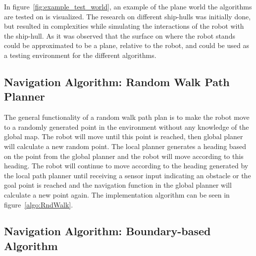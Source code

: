 In figure~\ref{fig:example_test_world}, an example of the plane world the algorithms are tested on is visualized. The research on different ship-hulls was initially done, but resulted in complexities while simulating the interactions of the robot with the ship-hull. As it was observed that the surface on where the robot stands could be approximated to be a plane, relative to the robot, and could be used as a testing environment for the different algorithms.

\subsection{Navigation Algorithm: Random Walk Path Planner}\label{section:rng_walk}

The general functionality of a random walk path plan is to make the robot move to a randomly generated point in the environment without any knowledge of the global map. The robot will move until this point is reached, then global planer will calculate a new random point. The local planner generates a heading based on the point from the global planner and the robot will move according to this heading. The robot will continue to move according to the heading generated by the local path planner until receiving a sensor input indicating an obstacle or the goal point is reached and the navigation function in the global planner will calculate a new point again. The implementation algorithm can be seen in figure~\ref{algo:RndWalk}.



%



\subsection{Navigation Algorithm: Boundary-based Algorithm }%

